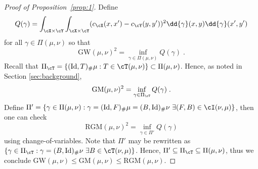 \documentclass[11pt]{article}
\begin{document}
\begin{proof}[Proof of Proposition~\ref{prop:1}]
	Define
	\begin{equation*}
		Q(\gamma) = \int_{\cX \times \cY} \int_{\cX \times \cY} (c_{\cX}(x, x') - c_{\cY}(y, y'))^2 \dd{\gamma}(x, y) \dd{\gamma}(x', y')
	\end{equation*}
	for all $\gamma \in \Pi(\mu, \nu)$ so that
	\begin{equation*}
		\mathrm{GW}(\mu, \nu)^2 = \inf_{\gamma \in \Pi(\mu, \nu)} Q(\gamma) \;.
	\end{equation*}
	Recall that $\Pi_{\cT} = \{(\mathrm{Id}, T)_{\#} \mu : T \in \cT(\mu, \nu)\} \subset \Pi(\mu, \nu)$. Hence, as noted in Section \ref{sec:background}, 
	\begin{equation*}
		\mathrm{GM}(\mu, \nu)^2 = \inf_{\gamma \in \Pi_{\cT}} Q(\gamma) \;.
	\end{equation*}
	Define $\Pi' = \{\gamma \in \Pi(\mu, \nu) : \gamma = (\mathrm{Id}, F)_{\#} \mu = (B, \mathrm{Id})_{\#} \nu ~ \exists (F, B) \in \cI(\nu, \mu) \}$, then one can check
	\begin{equation*}
		\mathrm{RGM}(\mu, \nu)^2 = \inf_{\gamma \in \Pi'} Q(\gamma)
	\end{equation*}
	using change-of-variables. Note that $\Pi'$ may be rewritten as $\{\gamma \in \Pi_{\cT} : \gamma = (B, \mathrm{Id})_{\#} \nu ~ \exists B \in \cT(\nu, \mu) \}$. Hence, $\Pi' \subseteq \Pi_{\cT} \subseteq \Pi(\mu, \nu)$, thus we conclude $\mathrm{GW}(\mu, \nu) \le \mathrm{GM}(\mu, \nu) \le \mathrm{RGM}(\mu, \nu)$.
\end{proof}
\end{document}
